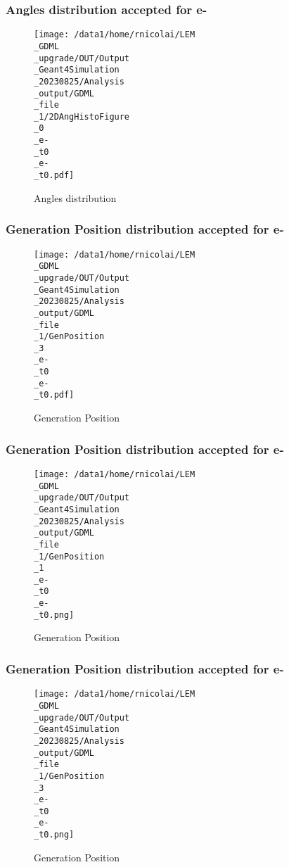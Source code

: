 \documentclass[8pt]{beamer}
\begin{document}
            \begin{frame}
                \frametitle{Angles distribution accepted for e-}
            
        \begin{figure}[h]
            \centering
            \texttt{[image: /data1/home/rnicolai/LEM\\\_GDML\\\_upgrade/OUT/Output\\\_Geant4Simulation\\\_20230825/Analysis\\\_output/GDML\\\_file\\\_1/2DAngHistoFigure\\\_0\\\_e-\\\_t0\\\_e-\\\_t0.pdf]}
            \caption{Angles distribution}
        \end{figure}
        
            \end{frame}
            
            \begin{frame}
                \frametitle{Generation Position distribution accepted for e-}
            
        \begin{figure}[h]
            \centering
            \texttt{[image: /data1/home/rnicolai/LEM\\\_GDML\\\_upgrade/OUT/Output\\\_Geant4Simulation\\\_20230825/Analysis\\\_output/GDML\\\_file\\\_1/GenPosition\\\_3\\\_e-\\\_t0\\\_e-\\\_t0.pdf]}
            \caption{Generation Position}
        \end{figure}
        
            \end{frame}
            
            \begin{frame}
                \frametitle{Generation Position distribution accepted for e-}
            
        \begin{figure}[h]
            \centering
            \texttt{[image: /data1/home/rnicolai/LEM\\\_GDML\\\_upgrade/OUT/Output\\\_Geant4Simulation\\\_20230825/Analysis\\\_output/GDML\\\_file\\\_1/GenPosition\\\_1\\\_e-\\\_t0\\\_e-\\\_t0.png]}
            \caption{Generation Position}
        \end{figure}
        
            \end{frame}
            
            \begin{frame}
                \frametitle{Generation Position distribution accepted for e-}
            
        \begin{figure}[h]
            \centering
            \texttt{[image: /data1/home/rnicolai/LEM\\\_GDML\\\_upgrade/OUT/Output\\\_Geant4Simulation\\\_20230825/Analysis\\\_output/GDML\\\_file\\\_1/GenPosition\\\_3\\\_e-\\\_t0\\\_e-\\\_t0.png]}
            \caption{Generation Position}
        \end{figure}
        
            \end{frame}
            
\end{document}
